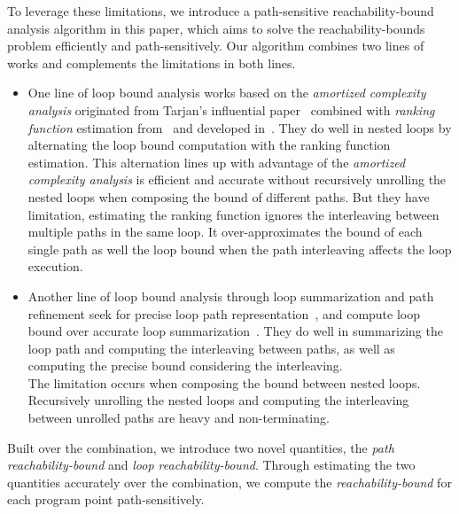 To leverage these limitations,
we introduce a path-sensitive reachability-bound analysis algorithm in this paper, which aims to solve 
the reachability-bounds problem efficiently and path-sensitively.
Our algorithm combines two lines of works and complements the limitations in both lines.
\begin{itemize}
  \item One line of loop bound analysis works based on the \emph{amortized complexity analysis} originated from Tarjan's influential paper~\cite{PotechinP17} combined with \emph{ranking function} estimation from~\cite{BradleyMS05} and developed in~\cite{ZulegerGSV11,SinnZV14,SinnZV17,LuCT21,AliasDFG10}.
  They do well in nested loops by alternating the loop bound computation with the ranking function estimation. This alternation lines up with advantage of the \emph{amortized complexity analysis} is efficient and accurate without recursively unrolling the nested loops when composing the bound of different paths.
  But they have limitation, estimating the ranking function ignores the interleaving between multiple paths in the same loop.
  It over-approximates the bound of each single path as well the loop bound when the path interleaving affects the loop execution.
  \item 
  Another line of loop bound analysis through loop summarization and path refinement seek for precise loop path representation~\cite{ManoliosV06,BalakrishnanSIG09,SharmaDDA11,Flores-MontoyaH14,HumenbergerJK18,CyphertBKR19}, and compute loop bound over accurate loop summarization~\cite{GulwaniJK09,ZulegerGSV11}.
  They do well in summarizing the loop path and computing the interleaving between paths, as well as computing the precise bound considering the interleaving.
  \\
  The limitation occurs when composing the bound between nested loops. Recursively unrolling the nested loops and computing the interleaving between unrolled paths are heavy and non-terminating.
\end{itemize}
Built over the combination, we introduce two novel quantities,
the \emph{path reachability-bound} and \emph{loop reachability-bound}. Through estimating the two quantities accurately over the combination, we compute the \emph{reachability-bound} for each program point path-sensitively.

